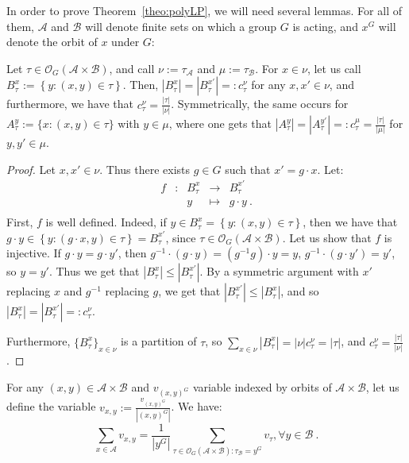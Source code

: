In order to prove Theorem~\ref{theo:polyLP}, we will need several lemmas. For all of them, $\mathcal{A}$ and $\mathcal{B}$ will denote finite sets on which a group $G$ is acting, and $x^G$ will denote the orbit of $x$ under $G$:

\begin{lemma}
  \label{lem:orbitProjCard}
  Let $\tau \in \mathcal{O}_G(\mathcal{A} \times \mathcal{B})$, and call $\nu := \tau_{\mathcal{A}}$ and $\mu := \tau_{\mathcal{B}}$. For $x \in \nu$, let us call $B_{\tau}^x := \left\{y:(x,y)\in\tau\right\}$. Then, $|B_{\tau}^x|=|B_{\tau}^{x'}|=:c_{\tau}^{\nu}$ for any $x,x' \in \nu$, and furthermore, we have that $c_{\tau}^{\nu}=\frac{|\tau|}{|\nu|}$. Symmetrically, the same occurs for $A_{\tau}^y := \{x:(x,y)\in\tau\}$ with $y \in \mu$, where one gets that $|A_{\tau}^y|=|A_{\tau}^{y'}|=:c_{\tau}^{\mu}=\frac{|\tau|}{|\mu|}$ for $y,y' \in \mu$.
\end{lemma}

\begin{proof}
  Let $x,x' \in \nu$. Thus there exists $g \in G$ such that $x' = g \cdot x$. Let:
  \[ \begin{array}{ccccc}
    f & : & B_{\tau}^x  & \to & B_{\tau}^{x'} \\
    & & y & \mapsto & g \cdot y \ .\\
  \end{array}\]
  First, $f$ is well defined. Indeed, if $y \in B_{\tau}^x = \left\{y:(x,y)\in\tau\right\}$, then we have that $g \cdot y \in \left\{y:(g \cdot x,y)\in\tau\right\} = B_{\tau}^{x'}$, since $\tau \in \mathcal{O}_G(\mathcal{A} \times \mathcal{B})$. Let us show that $f$ is injective. If $g \cdot y = g \cdot y'$, then $g^{-1} \cdot (g \cdot y) = (g^{-1}g) \cdot y = y$, $g^{-1} \cdot (g \cdot y') = y'$, so $y=y'$. Thus we get that $|B_{\tau}^x|\leq|B_{\tau}^{x'}|$. By a symmetric argument with $x'$ replacing $x$ and $g^{-1}$ replacing $g$, we get that $|B_{\tau}^{x'}|\leq|B_{\tau}^x|$, and so $|B_{\tau}^x|=|B_{\tau}^{x'}|=:c_{\tau}^{\nu}$.

  Furthermore, $\{ B_{\tau}^x \}_{x \in \nu}$ is a partition of $\tau$, so $\sum_{x \in \nu} |B_{\tau}^x| = |\nu| c_{\tau}^{\nu} = |\tau|$, and $c_{\tau}^{\nu}=\frac{|\tau|}{|\nu|}$.
\end{proof}

\begin{lemma}
  \label{lem:fromOrbitToEle} For any $(x,y) \in \mathcal{A} \times \mathcal{B}$ and $v_{(x,y)^G}$ variable indexed by orbits of $\mathcal{A} \times \mathcal{B}$, let us define the variable $v_{x,y} := \frac{v_{(x,y)^G}}{|(x,y)^G|}$. We have:
  \[ \sum_{x \in \mathcal{A}} v_{x,y} = \frac{1}{|y^G|}\sum_{\tau \in \mathcal{O}_G(\mathcal{A} \times \mathcal{B}): \tau_{\mathcal{B}}=y^G} v_{\tau}, \forall y \in \mathcal{B} \ .\]
\end{lemma}

